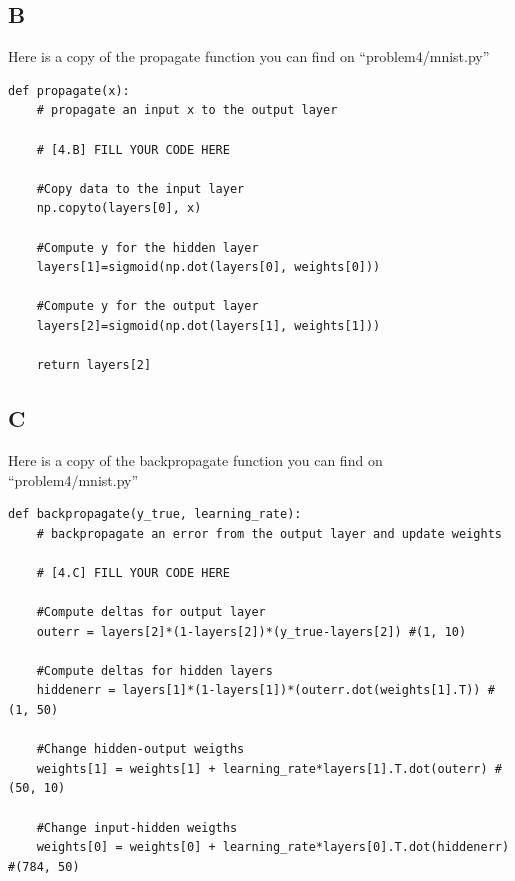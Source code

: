 \documentclass{article}
\begin{document}
        \subsection{B}
            Here is a copy of the propagate function you can find on ``problem4/mnist.py''\\
            \begin{verbatim}
def propagate(x):
    # propagate an input x to the output layer

    # [4.B] FILL YOUR CODE HERE

    #Copy data to the input layer
    np.copyto(layers[0], x)

    #Compute y for the hidden layer
    layers[1]=sigmoid(np.dot(layers[0], weights[0]))

    #Compute y for the output layer
    layers[2]=sigmoid(np.dot(layers[1], weights[1]))

    return layers[2]
            \end{verbatim}
        \subsection{C}
            Here is a copy of the backpropagate function you can find on ``problem4/mnist.py''\\
            \begin{verbatim}
def backpropagate(y_true, learning_rate):
    # backpropagate an error from the output layer and update weights

    # [4.C] FILL YOUR CODE HERE

    #Compute deltas for output layer
    outerr = layers[2]*(1-layers[2])*(y_true-layers[2]) #(1, 10)

    #Compute deltas for hidden layers
    hiddenerr = layers[1]*(1-layers[1])*(outerr.dot(weights[1].T)) #(1, 50)

    #Change hidden-output weigths
    weights[1] = weights[1] + learning_rate*layers[1].T.dot(outerr) #(50, 10)

    #Change input-hidden weigths
    weights[0] = weights[0] + learning_rate*layers[0].T.dot(hiddenerr) #(784, 50)
            \end{verbatim}
\end{document}
